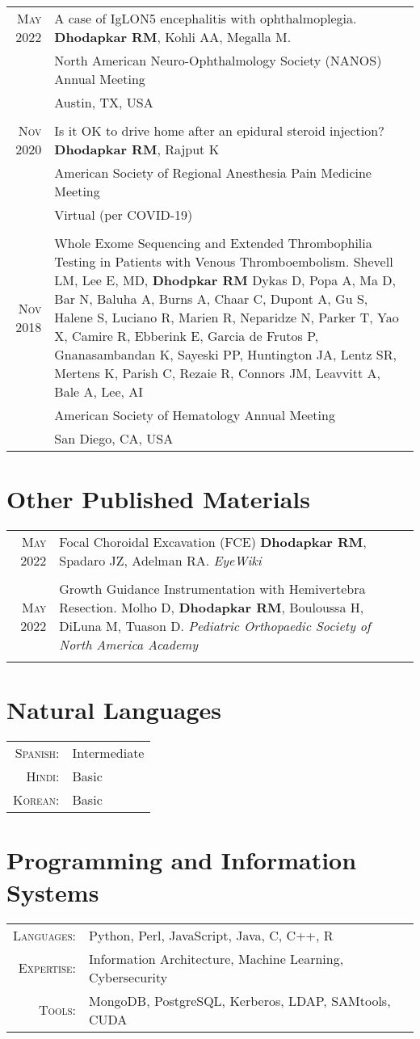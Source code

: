 \documentclass[a4paper,10pt]{article}
\begin{document}
\begin{tabular}{rp{11cm}}
 \textsc{May} 2022 & A case of IgLON5 encephalitis with ophthalmoplegia. {\bf Dhodapkar RM}, Kohli AA, Megalla M. \\
 								 & North American Neuro-Ophthalmology Society (NANOS) Annual Meeting \\
 								 & Austin, TX, USA  \\
 \multicolumn{2}{c}{} \\
 \textsc{Nov} 2020 & Is it OK to drive home after an epidural steroid injection? {\bf Dhodapkar RM}, Rajput K \\
 								 & American Society of Regional Anesthesia Pain Medicine Meeting \\
 								 & Virtual (per COVID-19)  \\ 
 \multicolumn{2}{c}{} \\
 \textsc{Nov} 2018 & Whole Exome Sequencing and Extended Thrombophilia Testing in Patients with Venous Thromboembolism.  Shevell LM, Lee E, MD, {\bf Dhodpkar RM} Dykas D, Popa A, Ma D, Bar N, Baluha A, Burns A, Chaar C, Dupont A, Gu S, Halene S, Luciano R, Marien R, Neparidze N, Parker T, Yao X, Camire R, Ebberink E, Garcia de Frutos P, Gnanasambandan K, Sayeski PP, Huntington JA, Lentz SR, Mertens K, Parish C, Rezaie R, Connors JM, Leavvitt A, Bale A, Lee, AI \\
 								 & American Society of Hematology Annual Meeting \\
 								 & San Diego, CA, USA\\
\end{tabular}


\section{Other Published Materials}
\begin{tabular}{rp{11cm}}
 \textsc{May} 2022 &  Focal Choroidal Excavation (FCE) {\bf Dhodapkar RM}, Spadaro JZ, Adelman RA. {\it EyeWiki} \\
 \multicolumn{2}{c}{} \\
 \textsc{May} 2022 &  Growth Guidance Instrumentation with Hemivertebra Resection.  Molho D, {\bf Dhodapkar RM}, Bouloussa H, DiLuna M, Tuason D. {\it Pediatric Orthopaedic Society of North America Academy} \\
 \multicolumn{2}{c}{}
\end{tabular}

\section{Natural Languages}
\begin{tabular}{rl}
\textsc{Spanish:}&Intermediate\\
\textsc{Hindi:}&Basic\\
\textsc{Korean:}&Basic\\
\end{tabular}

\section{Programming and Information Systems}
\begin{tabular}{rl}
\textsc{Languages:}&Python, Perl, JavaScript, Java, C, C++, R\\
\textsc{Expertise:}&Information Architecture, Machine Learning, Cybersecurity\\
\textsc{Tools:}&MongoDB, PostgreSQL, Kerberos, LDAP, SAMtools, CUDA
\end{tabular}
\end{document}
